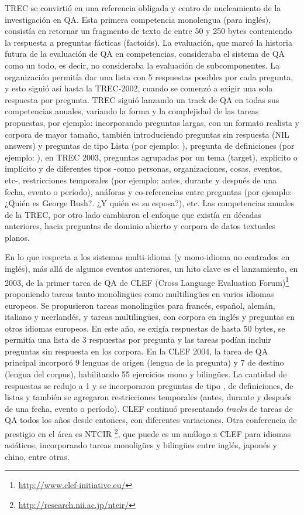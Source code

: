 TREC se convirtió en una referencia obligada y centro de nucleamiento de la investigación en QA. Esta primera competencia monolengua (para inglés), consistía en retornar un fragmento de texto de entre 50 y 250 bytes conteniendo la respuesta a preguntas fácticas (factoids). La evaluación, que marcó la historia futura de la evaluación de QA en competencias, consideraba el sistema de QA como un todo, es decir, no consideraba la evaluación de subcomponentes. La organización permitía dar una lista con 5 respuestas posibles por cada pregunta, y esto siguió así hasta la TREC-2002, cuando se comenzó a exigir una sola respuesta por pregunta. TREC siguió lanzando un track de QA en todas sus competencias anuales, variando la forma y la complejidad de las tareas propuestas, por ejemplo: incorporando preguntas largas, con un formato realista y corpora de mayor tamaño, también introduciendo preguntas sin respuesta (NIL answers) y preguntas de tipo Lista (por ejemplo: ), pregunta de definiciones (por ejemplo: ), en TREC 2003, preguntas agrupadas por un tema (target), explícito o implícito y de diferentes tipos -como personas, organizaciones, cosas, eventos, etc-, restricciones temporales (por ejemplo: antes, durante y después de una fecha, evento o período), anáforas y co-referencias entre preguntas (por ejemplo: ¿Quién es George Bush?. ¿Y quién es \textit{su} esposa?), etc. Las competencias anuales de la TREC, por otro lado cambiaron el enfoque que existía en décadas anteriores, hacia preguntas de dominio abierto y corpora de datos textuales planos. 

En lo que respecta a los sistemas multi-idioma (y mono-idioma no centrados en inglés), más allá de algunos eventos anteriores, un hito clave es el lanzamiento, en 2003, de la primer tarea de QA \cite{CLEF03} de CLEF (Cross Language Evaluation Forum)\footnote{\url{http://www.clef-initiative.eu/}} proponiendo tareas tanto monolingües como multilingües en varios idiomas europeos. Se propusieron tareas monolingües para francés, español, alemán, italiano y neerlandés, y tareas multilingües, con corpora en inglés y preguntas en otros idiomas europeos. En este año, se exigía respuestas de hasta 50 bytes, se permitía una lista de 3 respuestas por pregunta y las tareas podían incluir preguntas sin respuesta en los corpora. En la CLEF 2004, la tarea de QA principal incorporó 9 lenguas de origen (lengua de la pregunta) y 7 de destino (lengua del corpus), habilitando 55 ejercicios mono y bilingües. La cantidad de respuestas se redujo a 1 y se incorporaron preguntas de tipo , de definiciones, de listas y también se agregaron restricciones temporales (antes, durante y después de una fecha, evento o período). CLEF continuó presentando {\em tracks} de tareas de QA todos los años desde entonces, con diferentes variaciones. Otra conferencia de prestigio en el área es NTCIR \footnote{\url{http://research.nii.ac.jp/ntcir/}}, que puede es un análogo a CLEF para idiomas asiáticos, incorporando tareas monoligües y bilingües entre inglés, japonés y chino, entre otras.

